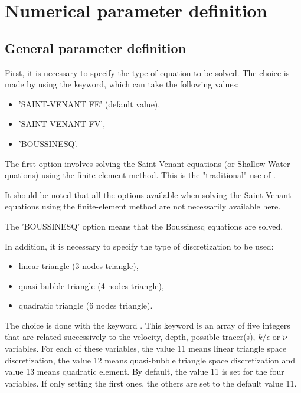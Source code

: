 \chapter{Numerical parameter definition}
\label{ch:num:par:def}

\section{General parameter definition}

First, it is necessary to specify the type of equation to be solved.
The choice is made by using the  keyword, which can take the
following values:

\begin{itemize}
\item 'SAINT-VENANT FE' (default value),

\item 'SAINT-VENANT FV',

\item 'BOUSSINESQ'.
\end{itemize}

The first option involves solving the Saint-Venant equations
(or Shallow Water quations) using the finite-element method.
This is the "traditional" use of .

It should be noted that all the options available when solving the Saint-Venant
equations using the finite-element method are not necessarily available here.

The 'BOUSSINESQ' option means that the Boussinesq equations are solved.

In addition, it is necessary to specify the type of discretization to be used:
\begin{itemize}
\item linear triangle (3 nodes triangle),
\item quasi-bubble triangle (4 nodes triangle),
\item quadratic triangle (6 nodes triangle).
\end{itemize}
The choice is done with the keyword .
This keyword is an array of five integers that are related successively
to the velocity, depth, possible tracer(s), $k$/$\epsilon$
or $\tilde{\nu}$ variables.
For each of these variables,
the value 11 means linear triangle space discretization,
the value 12 means quasi-bubble triangle space discretization
and value 13 means quadratic element.
By default, the value 11 is set for the four variables.
If only setting the first ones, the others are set to the default value 11.

